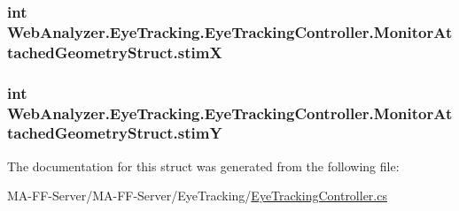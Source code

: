 \subsubsection[{stim\+X}]{\setlength{\rightskip}{0pt plus 5cm}int Web\+Analyzer.\+Eye\+Tracking.\+Eye\+Tracking\+Controller.\+Monitor\+Attached\+Geometry\+Struct.\+stim\+X}\label{struct_web_analyzer_1_1_eye_tracking_1_1_eye_tracking_controller_1_1_monitor_attached_geometry_struct_ad1f1c7a068c4900c1d03436441473b6e}
\hypertarget{struct_web_analyzer_1_1_eye_tracking_1_1_eye_tracking_controller_1_1_monitor_attached_geometry_struct_a0d4f9e13c008494155446587f41df63e}{}
\subsubsection[{stim\+Y}]{\setlength{\rightskip}{0pt plus 5cm}int Web\+Analyzer.\+Eye\+Tracking.\+Eye\+Tracking\+Controller.\+Monitor\+Attached\+Geometry\+Struct.\+stim\+Y}\label{struct_web_analyzer_1_1_eye_tracking_1_1_eye_tracking_controller_1_1_monitor_attached_geometry_struct_a0d4f9e13c008494155446587f41df63e}


The documentation for this struct was generated from the following file\+:\begin{DoxyCompactItemize}
\item 
M\+A-\/\+F\+F-\/\+Server/\+M\+A-\/\+F\+F-\/\+Server/\+Eye\+Tracking/\hyperlink{_eye_tracking_controller_8cs}{Eye\+Tracking\+Controller.\+cs}\end{DoxyCompactItemize}
